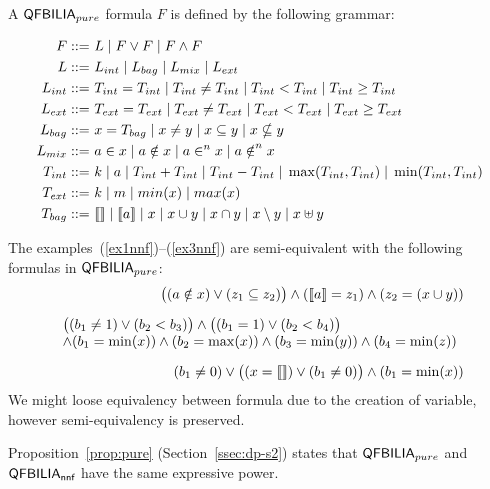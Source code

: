 \begin{mydef}
A $\textsf{QFBILIA}_{pure}$ formula $F$ is defined by the following grammar:
\begin{small}
\begin{align*}
F ::= &\ L \; | \; F\lor F \; | \; F\land F
\\
L ::= &\ L_{int} \; |\; L_{bag} \; |\; L_{mix} \; |\; L_{ext}
\\
L_{int} ::= &\ T_{int} = T_{int} \; |\; T_{int} \neq T_{int} \; |\; T_{int} < T_{int}\; |\; T_{int} \ge T_{int}
\\
L_{ext} ::= &\ T_{ext} = T_{ext} \; |\; T_{ext} \neq T_{ext} \; |\; T_{ext} < T_{ext}\; |\; T_{ext} \ge T_{ext}
\\
L_{bag} ::= &\ x = T_{bag} \; |\;x \neq y \; |\;x \subseteq y \; |\;x \nsubseteq y
\\
L_{mix} ::= &\ a \in x\; |\;a \notin x\; |\;a \in^{n} x\; |\;a \notin^{n} x
\\
T_{int} ::= &\ k \;|\; a \;|\; T_{int} + T_{int} \;|\; T_{int} - T_{int}\;|\; \max(T_{int},T_{int})\;|\; \min(T_{int},T_{int})
\\
T_{ext} ::= &\ k \;|\; m \;|\; min(x) \;|\; max(x)
\\
T_{bag} ::= &\ \llbracket  \rrbracket\;|\;\llbracket a \rrbracket \;|\;x \;|\; x \cup y \;|\; x \cap y\;|\; x \setminus y\;|\; x \uplus y
\end{align*}
\end{small}
\end{mydef}

The examples~(\ref{ex1nnf})--(\ref{ex3nnf}) are semi-equivalent with the following formulas in $\textsf{QFBILIA}_{pure}$:
\begin{align}
\big((a \notin x) \lor (z_1 \subseteq z_2)\big) \land (\llbracket a \rrbracket = z_1) \land (z_2 = (x\cup y))
\label{ex1pure}
\\[2mm]
\begin{array}{l}
\big((b_1 \neq 1) \lor (b_2<b_3)\big) \land \big((b_1 = 1) \lor (b_2 < b_4)\big) \\
\land (b_1 = \min(x)) \land (b_2 = \max(x)) \land (b_3 = \min(y)) \land (b_4 = \min(z))
\end{array}
\label{ex2pure}
\\[2mm]
(b_1 \neq 0) \lor \big((x = \llbracket  \rrbracket) \lor (b_1 \neq 0)\big)
\land (b_1 = \min(x))
\label{ex3pure}
\end{align}
We might loose equivalency between formula due to the creation of variable, however semi-equivalency is preserved.

Proposition~\ref{prop:pure} (Section~\ref{ssec:dp-s2}) states that $\textsf{QFBILIA}_{pure}$ and $\textsf{QFBILIA}_{\textsf{nnf}}$ have the same expressive power.
